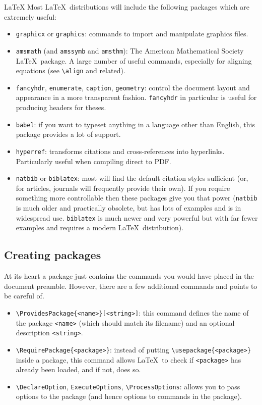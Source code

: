 \begin{chapter}{\LaTeX}
Most \LaTeX\ distributions will include the following packages which are extremely useful:
\begin{itemize}
\item \texttt{graphicx} or \texttt{graphics}: commands to import and manipulate graphics files.
\item \texttt{amsmath} (and \texttt{amssymb} and \texttt{amsthm}): The American Mathematical Society \LaTeX\ package. A large number of useful commands, especially for aligning equations (see \verb|\align| and related).
\item \texttt{fancyhdr}, \texttt{enumerate}, \texttt{caption}, \texttt{geometry}: control the document layout and appearance in a more transparent fashion. \texttt{fancyhdr} in particular is useful for producing headers for theses.
\item \texttt{babel}: if you want to typeset anything in a language other than English, this package provides a lot of support.
\item \texttt{hyperref}: transforms citations and cross-references into hyperlinks. Particularly useful when compiling direct to PDF.
\item \texttt{natbib} or \texttt{biblatex}: most will find the default citation styles sufficient (or, for articles, journals will frequently provide their own). If you require something more controllable then these packages give you that power (\texttt{natbib} is much older and practically obsolete, but has lots of examples and is in widespread use. \texttt{biblatex} is much newer and very powerful but with far fewer examples and requires a modern \LaTeX\ distribution).
\end{itemize}

\subsection{Creating packages}
\label{sec:packages_creating}

At its heart a package just contains the commands you would have placed in the document preamble. However, there are a few additional commands and points to be careful of.

\begin{itemize}
\item \verb|\ProvidesPackage{<name>}[<string>]|: this command defines the name of the package \verb|<name>| (which should match its filename) and an optional description \verb|<string>|.
\item \verb|\RequirePackage{<package>}|: instead of putting \verb|\usepackage{<package>}| inside a package, this command allows \LaTeX\ to check if \verb|<package>| has already been loaded, and if not, does so.
\item \verb|\DeclareOption|, \verb|ExecuteOptions|, \verb|\ProcessOptions|: allows you to pass options to the package (and hence options to commands in the package).
\end{itemize}


\end{chapter}
